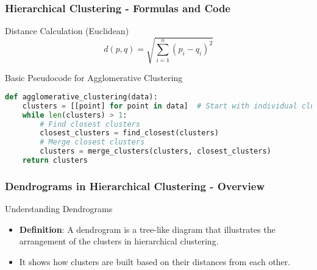 \documentclass{beamer}
\begin{document}
\begin{frame}[fragile]
    \frametitle{Hierarchical Clustering - Formulas and Code}
    \begin{block}{Distance Calculation (Euclidean)}
        \begin{equation}
            d(p,q) = \sqrt{\sum_{i=1}^{n} (p_i - q_i)^2}
        \end{equation}
    \end{block}
    \begin{block}{Basic Pseudocode for Agglomerative Clustering}
        \begin{lstlisting}[language=Python]
def agglomerative_clustering(data):
    clusters = [[point] for point in data]  # Start with individual clusters
    while len(clusters) > 1:
        # Find closest clusters
        closest_clusters = find_closest(clusters)
        # Merge closest clusters
        clusters = merge_clusters(clusters, closest_clusters)
    return clusters
        \end{lstlisting}
    \end{block}
\end{frame}

\begin{frame}[fragile]
    \frametitle{Dendrograms in Hierarchical Clustering - Overview}
    \begin{block}{Understanding Dendrograms}
        \begin{itemize}
            \item \textbf{Definition}: A dendrogram is a tree-like diagram that illustrates the arrangement of the clusters in hierarchical clustering.
            \item It shows how clusters are built based on their distances from each other.
        \end{itemize}
    \end{block}
\end{frame}
\end{document}
